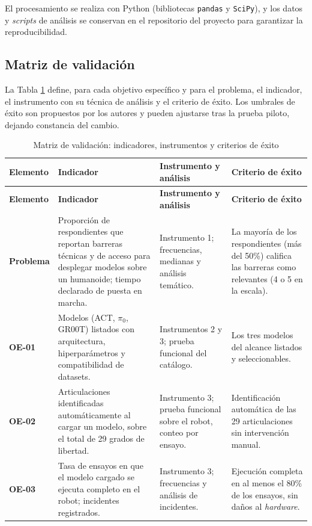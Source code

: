 \documentclass[stu,12pt,floatsintext]{apa7}
\begin{document}
El procesamiento se realiza con Python (bibliotecas \texttt{pandas} y \texttt{SciPy}), y los datos y \textit{scripts} de análisis se conservan en el repositorio del proyecto para garantizar la reproducibilidad.

\subsection{Matriz de validación}

La Tabla \ref{tab:validacion} define, para cada objetivo específico y para el problema, el indicador, el instrumento con su técnica de análisis y el criterio de éxito. Los umbrales de éxito son propuestos por los autores y pueden ajustarse tras la prueba piloto, dejando constancia del cambio.

\begin{longtable}{|p{2.3cm}|p{4.1cm}|p{4.4cm}|p{3.6cm}|}
\caption{Matriz de validación: indicadores, instrumentos y criterios de éxito}
\label{tab:validacion}\\
\hline
\rowcolor{gray!20}
\textbf{Elemento} & \textbf{Indicador} & \textbf{Instrumento y análisis} & \textbf{Criterio de éxito} \\
\hline
\endfirsthead
\hline
\rowcolor{gray!20}
\textbf{Elemento} & \textbf{Indicador} & \textbf{Instrumento y análisis} & \textbf{Criterio de éxito} \\
\hline
\endhead

\textbf{Problema} &
Proporción de respondientes que reportan barreras técnicas y de acceso para desplegar modelos sobre un humanoide; tiempo declarado de puesta en marcha. &
Instrumento 1; frecuencias, medianas y análisis temático. &
La mayoría de los respondientes (más del 50\%) califica las barreras como relevantes (4 o 5 en la escala). \\
\hline

\textbf{OE-01} &
Modelos (ACT, $\pi_0$, GR00T) listados con arquitectura, hiperparámetros y compatibilidad de datasets. &
Instrumentos 2 y 3; prueba funcional del catálogo. &
Los tres modelos del alcance listados y seleccionables. \\
\hline

\textbf{OE-02} &
Articulaciones identificadas automáticamente al cargar un modelo, sobre el total de 29 grados de libertad. &
Instrumento 3; prueba funcional sobre el robot, conteo por ensayo. &
Identificación automática de las 29 articulaciones sin intervención manual. \\
\hline

\textbf{OE-03} &
Tasa de ensayos en que el modelo cargado se ejecuta completo en el robot; incidentes registrados. &
Instrumento 3; frecuencias y análisis de incidentes. &
Ejecución completa en al menos el 80\% de los ensayos, sin daños al \textit{hardware}. \\
\hline


\end{longtable}
\end{document}

